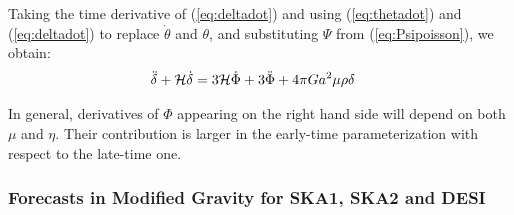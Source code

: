 \done{}
Taking the time derivative of (\ref{eq:deltadot}) and using (\ref{eq:thetadot}) and (\ref{eq:deltadot}) to 
replace $\dot \theta$ and $\theta$, and substituting $\Psi$ from (\ref{eq:Psipoisson}), we obtain:
\begin{align}\label{eq:dotdotdelta-mueta}
\ddot{\delta} + \mathcal{H} \dot{\delta} &= 3\mathcal{H} \dot{\Phi} + 3\ddot{\Phi} + 4 \pi G a^2 \mu \rho \delta
\end{align}

In general, derivatives of $\Phi$ appearing on the right hand side will depend on both $\mu$ and $\eta$. Their contribution is larger in the early-time parameterization with respect to the late-time one.


\subsubsection{Forecasts in Modified Gravity for SKA1, SKA2 and DESI \label{subsub: other-surveys-late-time}}

